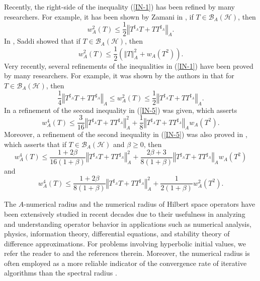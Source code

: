 \documentclass{article}
\newcommand{\bra}[1]{\left(#1\right)}
\newcommand{\normA}[1]{{\left\Vert#1\right\Vert}_{A}}
\newcommand {\h}{\mathcal{H}}
\newcommand {\Ta}{T^{\sharp_{A}}}
\renewcommand {\b}{\mathcal{B}}
\begin{document}
Recently, the right-side of the inequality (\ref{IN-1}) has been refined by many researchers. For example,
it has been shown by Zamani in \cite{Zamani-2}, if $T\in\b_A(\h)$, then
\begin{equation}\label{IN-3}
  w_A^2(T)\leq \frac{1}{2}\normA{\Ta T+T\Ta}.
\end{equation}
In \cite{Saddi}, Saddi showed that if $T\in\b_A(\h)$, then
\begin{equation}\label{IN-4}
  w_A^2(T)\leq \frac{1}{2}\bra{\normA{T}^2+w_A(T^2)}.
\end{equation}
Very recently, several refinements of the inequalities in (\ref{IN-1}) have been proved by many
researchers. For example, it was shown by the authors in \cite{Feki-2, Zamani-2} that for $T\in\b_A(\h)$,
then
\begin{equation}\label{IN-5}
  \frac{1}{4}\normA{\Ta T+T\Ta}\leq w_A^2(T)\leq \frac{1}{2}\normA{\Ta T+T\Ta}.
\end{equation}
In \cite{QHB} a refinement of the second inequality in (\ref{IN-5}) was given, which
asserts
\begin{equation}\label{IN-6}
  w_A^4(T)\leq \frac{3}{16}\normA{\Ta T+T\Ta}^2+\frac{1}{8}\normA{\Ta T+T\Ta}w_A(T^2).
\end{equation}
Moreover, a refinement of the second inequality in (\ref{IN-5}) was also proved in \cite{QHC}, which
asserts that if $T\in\b_A(\h)$ and $\beta\geq 0$, then
\begin{equation}\label{IN-7}
  w_A^4(T)\leq \frac{1+2\beta}{16(1+\beta)}\normA{\Ta T+T\Ta}^2+\frac{2\beta+3}{8(1+\beta)}\normA{\Ta T+T\Ta}w_A(T^2)
\end{equation}
and
\begin{equation}\label{IN-8}
  w_A^4(T)\leq \frac{1+2\beta}{8(1+\beta)}\normA{\Ta T+T\Ta}^2+\frac{1}{2(1+\beta)}w_A^2(T^2).
\end{equation}

The $A$-numerical radius and the numerical radius of Hilbert space operators have been extensively studied in recent decades due to their usefulness in analyzing and understanding operator behavior in applications such as numerical analysis, physics, information theory, differential equations, and stability theory of difference approximations. For problems involving hyperbolic initial values, we refer the reader to \cite{Feki, Feki-1, KZ, Saddi} and the references therein. Moreover, the numerical radius is often employed as a more reliable indicator of the convergence rate of iterative algorithms than the spectral radius \cite{BK, Hirz, Kit-S1, Kit-S2}.
\end{document}

